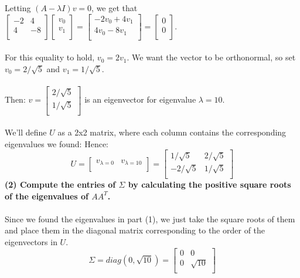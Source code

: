 \documentclass[11pt]{article}
\begin{document}
Letting $(A - \lambda I)v = 0$, we get that $ \begin{bmatrix}
-2 & 4 \\
4 & -8 \\
\end{bmatrix} \begin{bmatrix}
v_0 \\
v_1 \\
\end{bmatrix} = \begin{bmatrix}
-2v_0 + 4v_1 \\
4v_0 - 8v_1 \\
\end{bmatrix} = \begin{bmatrix}
0 \\
0 \\
\end{bmatrix} $. \\\\
For this equality to hold, $v_0 = 2v_1$. We want the vector to be orthonormal, so set $v_0 = 2 / \sqrt5$ and $v_1 = 1 / \sqrt5.$ \\\\
Then: $v = \begin{bmatrix}
2 / \sqrt5 \\
1 / \sqrt5 \\
\end{bmatrix}$ is an eigenvector for eigenvalue $\lambda = 10$. \\\\
We'll define $U$ as a 2x2 matrix, where each column contains the corresponding eigenvalues we found:
Hence:
$$ \boxed{ U = \begin{bmatrix} 
v_{\lambda = 0} & v_{\lambda = 10} \\
\end{bmatrix} = \begin{bmatrix}
1 / \sqrt5 & 2 / \sqrt5 \\
-2 / \sqrt5 & 1 / \sqrt5 \\
\end{bmatrix}}$$
\textbf{(2) Compute the entries of $\Sigma$ by calculating the positive square roots of the eigenvalues of $AA^T$.}
\\\\
Since we found the eigenvalues in part (1), we just take the square roots of them and place them in the diagonal matrix corresponding to the order of the eigenvectors in $U$.
$$\boxed{\Sigma = diag(0, \sqrt{10}) = \begin{bmatrix}
0 & 0 \\
0 & \sqrt{10} \\
\end{bmatrix}} $$
\end{document}
